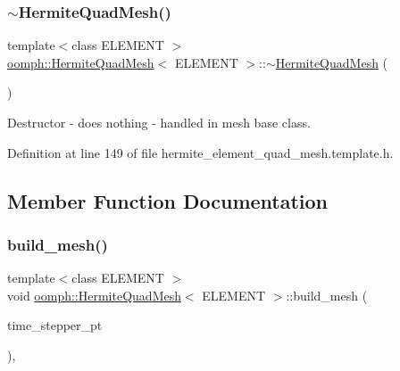\mbox{\label{classoomph_1_1HermiteQuadMesh_a81f14d729df268911cd3943efc125492}} 
\subsubsection{\texorpdfstring{$\sim$\+Hermite\+Quad\+Mesh()}{~HermiteQuadMesh()}}
{\footnotesize\ttfamily template$<$class E\+L\+E\+M\+E\+NT $>$ \\
\hyperlink{classoomph_1_1HermiteQuadMesh}{oomph\+::\+Hermite\+Quad\+Mesh}$<$ E\+L\+E\+M\+E\+NT $>$\+::$\sim$\hyperlink{classoomph_1_1HermiteQuadMesh}{Hermite\+Quad\+Mesh} (\begin{DoxyParamCaption}{ }\end{DoxyParamCaption})\hspace{0.3cm}{\ttfamily [inline]}}



Destructor -\/ does nothing -\/ handled in mesh base class. 



Definition at line 149 of file hermite\+\_\+element\+\_\+quad\+\_\+mesh.\+template.\+h.



\subsection{Member Function Documentation}
\mbox{\label{classoomph_1_1HermiteQuadMesh_af72fd9b700fdee643ce6d6259c0e8e6f}} 
\subsubsection{\texorpdfstring{build\+\_\+mesh()}{build\_mesh()}}
{\footnotesize\ttfamily template$<$class E\+L\+E\+M\+E\+NT $>$ \\
void \hyperlink{classoomph_1_1HermiteQuadMesh}{oomph\+::\+Hermite\+Quad\+Mesh}$<$ E\+L\+E\+M\+E\+NT $>$\+::build\+\_\+mesh (\begin{DoxyParamCaption}\item[{Time\+Stepper $\ast$}]{time\+\_\+stepper\+\_\+pt }\end{DoxyParamCaption})\hspace{0.3cm}{\ttfamily [private]}, {\ttfamily [virtual]}}



